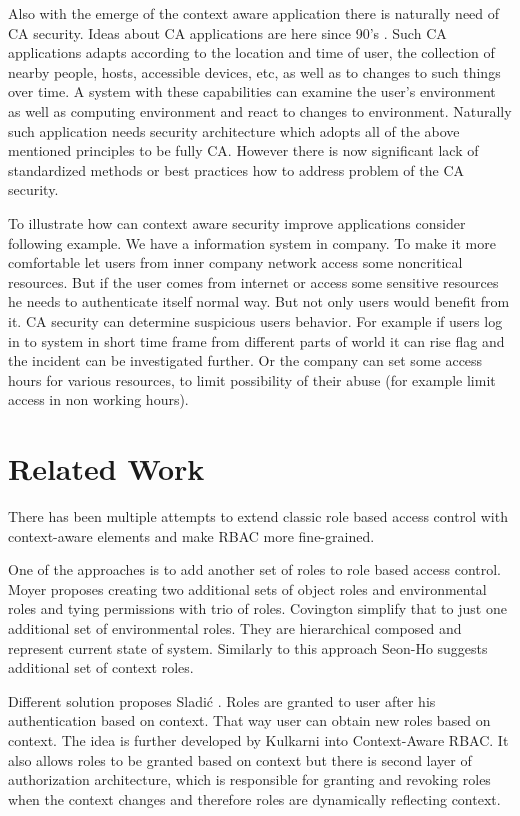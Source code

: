 \documentclass{poster15}
\begin{document}
Also with the emerge of the context aware application there is naturally need of CA security. Ideas about CA applications are here since 90's \cite{contextaware}. Such CA applications adapts according to the location and time of user, the collection of nearby people, hosts, accessible devices, etc, as well as to changes to such things over time. A system with these capabilities can examine the user's environment as well as computing environment and react to changes to environment. Naturally such application needs security architecture which adopts all of the above mentioned principles to be fully CA. However there is now significant lack of standardized methods or best practices how to address problem of the CA security.

To illustrate how can context aware security improve applications consider following example. We have a information system in company. To make it more comfortable let users from inner company network access some noncritical resources. But if the user comes from internet or access some sensitive resources he needs to authenticate itself normal way. But not only users would benefit from it. CA security can determine suspicious users behavior. For example if users log in to system in short time frame from different parts of world it can rise flag and the incident can be investigated further. Or the company can set some access hours for various resources, to limit possibility of their abuse (for example limit access in non working hours).

\section{Related Work}

There has been multiple attempts to extend classic role based access control with context-aware elements and make RBAC more fine-grained.

One of the approaches is to add another set of roles to role based access control. Moyer \cite{grbac} proposes creating two additional sets of object roles and environmental roles and tying permissions with trio of roles. Covington \cite{envroles} simplify that to just one additional set of environmental roles. They are hierarchical composed and represent current state of system. Similarly to this approach Seon-Ho \cite{contextroles} suggests additional set of context roles.

Different solution proposes Sladi\'c \cite{contextaccess}. Roles are granted to user after his authentication based on context. That way user can obtain new roles based on context. The idea is further developed by Kulkarni \cite{contextawarerbac} into Context-Aware RBAC. It also allows roles to be granted based on context but there is second layer of authorization architecture, which is responsible for granting and revoking roles when the context changes and therefore roles are dynamically reflecting context.
\end{document}
